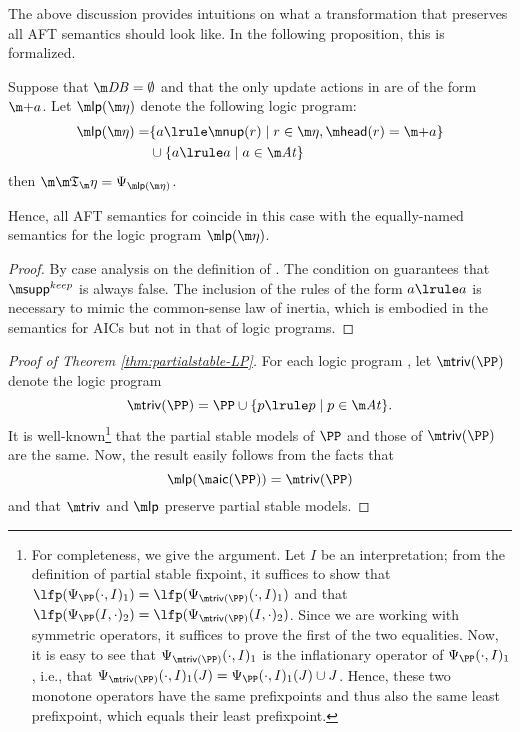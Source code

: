  
 The above discussion provides intuitions on what a transformation that preserves all AFT semantics should look like. In the following proposition, this is formalized. 

  


\begin{proposition}\label{prop:lplink}
  Suppose that $\db=\emptyset$ and that the only update actions in \aics are of the form $\add a$.
  Let $\lpop(\aics)$ denote the following logic program:  
 \begin{align*}
  \lpop(\aics)=& \{a \lrule \nup(r)\mid r\in \aics, \head(r)= \add a\}\\
  &\cup \{a \lrule a\mid a \in \atoms\}
 \end{align*}
 then $\Ap = \Psi_{\lpop(\aics)}$. 

Hence, all AFT semantics for \fulldb coincide in this case with the equally-named semantics for the logic program $\lpop(\aics)$. 
\end{proposition}
\begin{proof}
  By case analysis on the definition of \Ap.
  The condition on \fulldb guarantees that $\suppout$ is always false.
  The inclusion of the rules of the form $a\lrule a$ is necessary to mimic the common-sense law of inertia, which is embodied in the semantics for AICs but not in that of logic programs.
\end{proof}



\begin{proof}[Proof of Theorem \ref{thm:partialstable-LP}]
 For each logic program \PP, let $\triv(\PP)$ denote the logic program 
 \[
  \triv(\PP) = \PP \cup \{p\lrule p\mid p\in \atoms\}.
 \]
 It is well-known\footnote{For completeness, we give the argument. Let $I$ be an interpretation; from the definition of partial stable fixpoint, it suffices to show that 
 $\lfp(\Psi_\PP(\cdot,I)_1)= \lfp(\Psi_{\triv(\PP)}(\cdot,I)_1)$ and that 
  $\lfp(\Psi_\PP(I,\cdot)_2)= \lfp(\Psi_{\triv(\PP)}(I,\cdot)_2)$. Since we are working with symmetric operators, it suffices to prove the first of the two equalities. 
  Now, it is easy to see that $\Psi_{\triv(\PP)}(\cdot,I)_1$ is the inflationary operator of $\Psi_\PP(\cdot,I)_1$, i.e., that $\Psi_{\triv(\PP)}(\cdot,I)_1(J) = \Psi_\PP(\cdot,I)_1(J)\cup J$. Hence, these two monotone operators have the same prefixpoints and thus also the same least prefixpoint, which equals their least prefixpoint. 
  }
 that the partial stable models of $\PP$ and those of $\triv(\PP)$ are the same. 
 Now, the result easily follows from the facts that 
 \[\lpop(\aicop(\PP)) = \triv(\PP)\]
 and that $\triv$ and $\lpop$ preserve partial stable models. 
% 
\end{proof}


